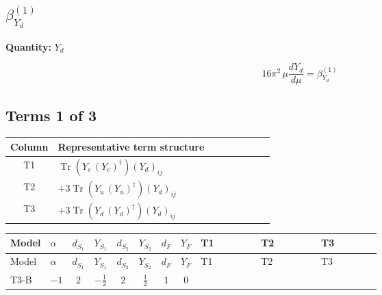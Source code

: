 \documentclass[8pt]{article}
\begin{document}
\begin{landscape}
\section*{$\beta_{Y_d}^{(1)}$}
\noindent\textbf{Quantity: }$Y_d$\par\smallskip
\[16\pi^2\,\mu\frac{d Y_d}{d\mu}=\beta_{Y_d}^{(1)}\]
\subsection*{Terms 1 of 3}
\begin{center}
\begin{tabular}{@{}c >{\raggedright\arraybackslash}p{0.82\linewidth}@{}}
\toprule
Column & Representative term structure \\
\midrule
T1 & \(\displaystyle \operatorname{Tr}\!\left({Y_e}\,\left({Y_e}\right)^{\dagger}\right) \left({Y_d}\right)_{ij}\) \\
\midrule
T2 & \(\displaystyle +3 \operatorname{Tr}\!\left({Y_u}\,\left({Y_u}\right)^{\dagger}\right) \left({Y_d}\right)_{ij}\) \\
\midrule
T3 & \(\displaystyle +3 \operatorname{Tr}\!\left({Y_d}\,\left({Y_d}\right)^{\dagger}\right) \left({Y_d}\right)_{ij}\) \\
\midrule
\bottomrule
\end{tabular}
\end{center}
\smallskip
\tiny
\begin{longtable}{@{}llcccccc >{\raggedright\arraybackslash}p{0.21\linewidth} >{\raggedright\arraybackslash}p{0.21\linewidth} >{\raggedright\arraybackslash}p{0.21\linewidth}@{}}
\toprule
Model & $\alpha$ & $d_{S_1}$ & $Y_{S_1}$ & $d_{S_2}$ & $Y_{S_2}$ & $d_F$ & $Y_F$ & T1 & T2 & T3 \\
\midrule
\endfirsthead
\toprule
Model & $\alpha$ & $d_{S_1}$ & $Y_{S_1}$ & $d_{S_2}$ & $Y_{S_2}$ & $d_F$ & $Y_F$ & T1 & T2 & T3 \\
\midrule
\endhead
T3-B & $-1$ & $2$ & $-\frac{1}{2}$ & $2$ & $\frac{1}{2}$ & $1$ & $0$ & \scriptsize\adjustbox{max width=\linewidth}{$\begin{gathered} \operatorname{Tr}\!\left({Y_e}\,\left({Y_e}\right)^{\dagger}\right) \left({Y_d}\right)_{ij}\end{gathered}$} & \scriptsize\adjustbox{max width=\linewidth}{$\begin{gathered} +3 \operatorname{Tr}\!\left({Y_u}\,\left({Y_u}\right)^{\dagger}\right) \left({Y_d}\right)_{ij}\end{gathered}$} & \scriptsize\adjustbox{max width=\linewidth}{$\begin{gathered} +3 \operatorname{Tr}\!\left({Y_d}\,\left({Y_d}\right)^{\dagger}\right) \left({Y_d}\right)_{ij}\end{gathered}$} \\

\end{longtable}
\end{landscape}
\end{document}
